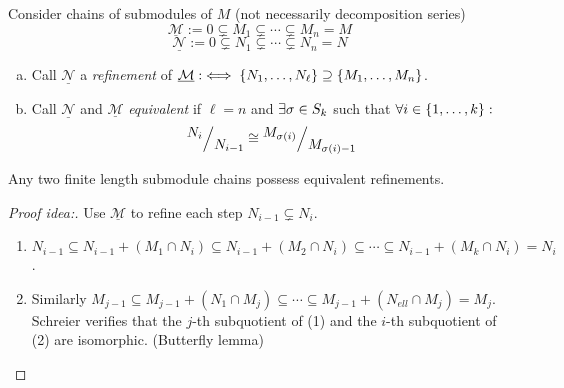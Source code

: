 \documentclass[a4paper]{report}
\begin{document}
\begin{defi*}
  Consider chains of submodules of $M$ (not necessarily decomposition series)
  \[\underline{\mathcal M}:= 0 \subsetneq M_{1} \subsetneq \cdots \subsetneq M_{n} = M\]
  \[\underline{\mathcal N}:= 0 \subsetneq N_{1} \subsetneq \cdots \subsetneq N_{n} = N\]
  \begin{enumerate}[(a)]
    \item Call $\underline{\mathcal N}$ a \emph{refinement} of $\underline{\mathcal M} :\iff \{N_{1}, \ldots, N_{\ell}\} \supseteq \{M_{1}, \ldots, M_{n}\}$.
    \item Call $\underline{\mathcal N}$ and $\underline{\mathcal M}$ \emph{equivalent} if $\ell = n$ and $\exists \sigma \in S_{k}$ such that $\forall i \in \{1, \ldots, k\}:$ \[\fak{N_{i}}{N_{i-1}} \cong \fak{M_{\s(i)}}{M_{\s(i)-1}}\]
  \end{enumerate}
\end{defi*}

\begin{lemm}%
  Any two finite length submodule chains possess equivalent refinements.
  \begin{proof}[Proof idea:] Use $\underline{\mathcal M}$ to refine each step $N_{i-1} \subsetneq N_{i}$.
    \begin{enumerate}[(1)]
\item $N_{i-1} \subseteq N_{i-1} + (M_{1} \cap N_{i}) \subseteq N_{i-1} + (M_{2} \cap N_{i}) \subseteq \cdots \subseteq N_{i-1} + (M_{k} \cap N_{i}) = N_{i}$.
\item Similarly $M_{j-1} \subseteq M_{j-1} + (N_{1} \cap M_{j}) \subseteq \cdots \subseteq M_{j-1} + (N_{ell} \cap M_{j}) = M_{j}$. Schreier verifies that the $j$-th subquotient of (1) and the $i$-th subquotient of (2) are isomorphic. (Butterfly lemma) \qedhere
    \end{enumerate}
  \end{proof}
\end{lemm}
\end{document}
